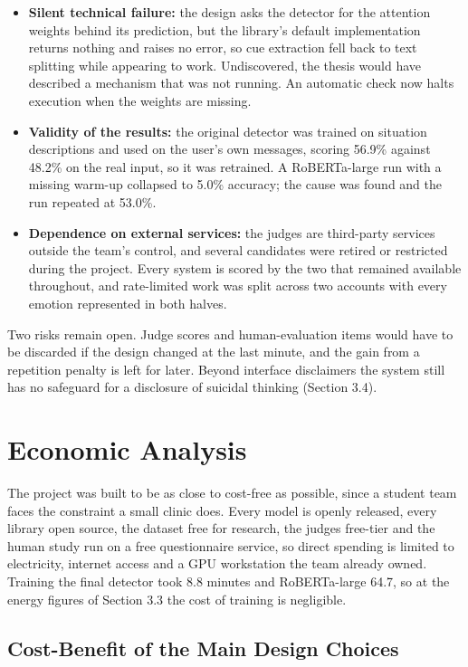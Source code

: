 \begin{itemize}
  \item \textbf{Silent technical failure:} the design asks the detector for the attention weights behind its prediction, but the library's default implementation returns nothing and raises no error, so cue extraction fell back to text splitting while appearing to work. Undiscovered, the thesis would have described a mechanism that was not running. An automatic check now halts execution when the weights are missing.
  \item \textbf{Validity of the results:} the original detector was trained on situation descriptions and used on the user's own messages, scoring 56.9\% against 48.2\% on the real input, so it was retrained. A RoBERTa-large run with a missing warm-up collapsed to 5.0\% accuracy; the cause was found and the run repeated at 53.0\%.
  \item \textbf{Dependence on external services:} the judges are third-party services outside the team's control, and several candidates were retired or restricted during the project. Every system is scored by the two that remained available throughout, and rate-limited work was split across two accounts with every emotion represented in both halves.
\end{itemize}
Two risks remain open. Judge scores and human-evaluation items would have to be discarded if the design changed at the last minute, and the gain from a repetition penalty is left for later. Beyond interface disclaimers the system still has no safeguard for a disclosure of suicidal thinking (Section 3.4).

\section{Economic Analysis}
\label{sec:3.8}

The project was built to be as close to cost-free as possible, since a student team faces the constraint a small clinic does. Every model is openly released, every library open source, the dataset free for research, the judges free-tier and the human study run on a free questionnaire service, so direct spending is limited to electricity, internet access and a GPU workstation the team already owned. Training the final detector took 8.8 minutes and RoBERTa-large 64.7, so at the energy figures of Section 3.3 the cost of training is negligible.

\subsection{Cost-Benefit of the Main Design Choices}

